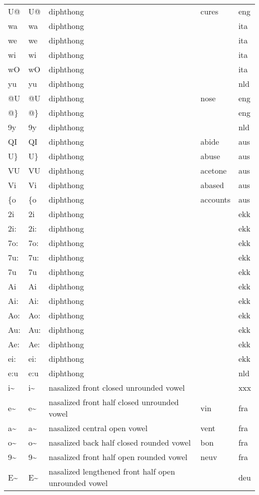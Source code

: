 \begin{longtable}{llp{}ll}
	U@ & U@ & diphthong & cures & eng\\
	wa & wa & diphthong & & ita\\
	we & we & diphthong & & ita\\
	wi & wi & diphthong & & ita\\
	wO & wO & diphthong & & ita\\
	yu & yu & diphthong & & nld\\
	@U & @U & diphthong & nose & eng\\
	@\} & @\} & diphthong & & eng\\
	9y & 9y & diphthong & & nld\\
	QI & QI & diphthong & abide & aus\\
	U\} & U\} & diphthong & abuse & aus\\
	VU & VU & diphthong & acetone & aus\\
	Vi & Vi & diphthong & abased & aus\\
	\{o & \{o & diphthong & accounts & aus\\
	2i & 2i & diphthong & & ekk\\
	2i: & 2i: & diphthong & & ekk\\
	7o: & 7o: & diphthong & & ekk\\
	7u: & 7u: & diphthong & & ekk\\
	7u & 7u & diphthong & & ekk\\
	Ai & Ai & diphthong & & ekk\\
	Ai: & Ai: & diphthong & & ekk\\
	Ao: & Ao: & diphthong & & ekk\\
	Au: & Au: & diphthong & & ekk\\
	Ae: & Ae: & diphthong & & ekk\\
	ei: & ei: & diphthong & & ekk\\
	e:u & e:u & diphthong & & nld\\
	i\textasciitilde & i\textasciitilde & nasalized front closed unrounded vowel & & xxx\\
	e\textasciitilde & e\textasciitilde & nasalized front half closed unrounded vowel & vin & fra\\
	a\textasciitilde & a\textasciitilde & nasalized central open vowel & vent & fra\\
	o\textasciitilde & o\textasciitilde & nasalized back half closed rounded vowel & bon & fra\\
	9\textasciitilde & 9\textasciitilde & nasalized front half open rounded vowel & neuv & fra\\
	E\textasciitilde & E\textasciitilde & nasalized lengthened front half open unrounded vowel & & deu\\

\end{longtable}
